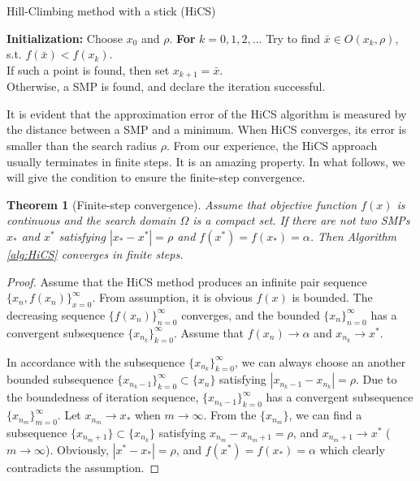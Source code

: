 \documentclass[final,1p,times]{elsarticle}
\newtheorem{theorem}{Theorem}
\begin{document}
\begin{algorithm}[H]
	\caption{Hill-Climbing method with a stick (HiCS)}
	\label{alg:HiCS}
\begin{algorithmic}[1]
	\STATE \textbf{Initialization:} Choose $x_0$ and $\rho$.
	\STATE \textbf{For} $k=0,1,2,\dots$
	\STATE \hspace{0.5cm} Try to find $\bar{x}\in O(x_k, \rho)$,
		   s.t. $f(\bar x)<f(x_k)$.
			\\
		 \hspace{0.5cm} If such a point is found, then set
		 $x_{k+1}= \bar{x}$.
		  \\
		   \hspace{0.5cm} Otherwise, a SMP is found, 
		   and declare the iteration successful.
\end{algorithmic}
\end{algorithm}
It is evident that the approximation error of the HiCS algorithm
is measured by the distance between a SMP and a minimum.
When HiCS converges, its error is smaller than the search radius
$\rho$.
From our experience, the HiCS approach usually terminates in 
finite steps. It is an amazing property. In what follows, we will
give the condition to ensure the finite-step convergence.

\begin{theorem}[Finite-step convergence]
	\label{thm:fsc}
	Assume that objective function $f(x)$ is continuous and the
	search domain $\Omega$ is a compact set.
	If there are not two SMPs $x_*$ and $x^*$ satisfying 
	$|x_*-x^*|=\rho$ and $f(x^*)=f(x_*)=\alpha$.
	Then Algorithm \ref{alg:HiCS} converges in finite steps.
\end{theorem}
\begin{proof}
	Assume that the HiCS method produces an infinite pair sequence
	$\{x_n, f(x_n)\}_{x=0}^{\infty}$. From assumption,
	it is obvious $f(x)$ is bounded. The decreasing sequence
	$\{f(x_n)\}_{n=0}^\infty$ converges, and the bounded
	$\{x_n\}_{n=0}^\infty$ has a convergent subsequence 
	$\{x_{n_k}\}_{k=0}^\infty$. Assume that $f(x_n)\rightarrow
	\alpha$ and $x_{n_k}\rightarrow x^*$. 
	
	In accordance with the subsequence
	$\{x_{n_k}\}_{k=0}^\infty$, we can always choose an another
	bounded subsequence $\{x_{n_k -1}\}_{k=0}^\infty \subset
	\{x_n\}$ satisfying $|x_{n_k - 1}-x_{n_k}|=\rho$. 
	Due to the boundedness of iteration
	sequence, $\{x_{n_k-1}\}_{k=0}^\infty$ has a convergent
	subsequence $\{x_{n_{m}}\}_{m=0}^\infty$. Let $x_{n_m}
	\rightarrow x_*$ when $m\rightarrow \infty$. 
	From the $\{x_{n_m}\}$, we can find a subsequence
	$\{x_{n_{m}+1}\}\subset \{x_{n_k}\}$ satisfying
	$x_{n_m}-x_{n_{m}+1}=\rho$, and $x_{n_{m}+1}\rightarrow x^*$
	($m\rightarrow \infty$).
	Obviously, $|x^*-x_*|=\rho$, and $f(x^*)=f(x_*)=\alpha$ 
	which clearly contradicts the assumption.
\end{proof}
\end{document}
